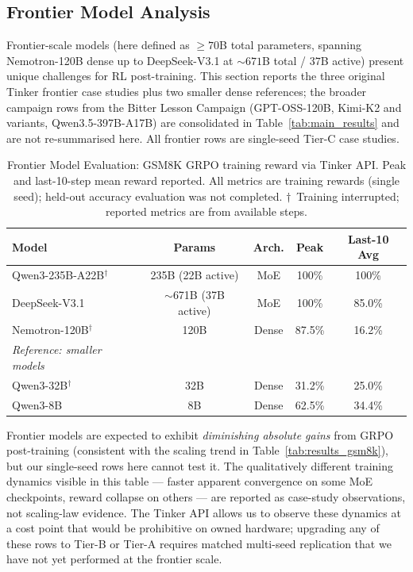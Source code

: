 \documentclass{article}
\begin{document}
\subsection{Frontier Model Analysis}
\label{sec:frontier}

Frontier-scale models (here defined as $\ge 70$B total parameters,
spanning Nemotron-120B dense up to DeepSeek-V3.1 at $\sim 671$B
total / $37$B active) present unique challenges for RL post-training.
This section reports the three original Tinker frontier case
studies plus two smaller dense references; the broader
campaign rows from the Bitter Lesson Campaign
(GPT-OSS-120B, Kimi-K2 and variants, Qwen3.5-397B-A17B) are
consolidated in Table~\ref{tab:main_results} and are not
re-summarised here. All frontier rows are single-seed Tier-C case
studies.

\begin{table}[htbp]
\centering
\caption{Frontier Model Evaluation: GSM8K GRPO training reward via Tinker API.
Peak and last-10-step mean reward reported. All metrics are training rewards
(single seed); held-out accuracy evaluation was not completed.
$\dagger$~Training interrupted; reported metrics are from available steps.}
\label{tab:frontier}
\begin{tabular}{lcccc}
\toprule
\textbf{Model} & \textbf{Params} & \textbf{Arch.} & \textbf{Peak} & \textbf{Last-10 Avg} \\
\midrule
Qwen3-235B-A22B$^\dagger$ & 235B (22B active) & MoE & 100\% & 100\% \\
DeepSeek-V3.1 & $\sim$671B (37B active) & MoE & 100\% & 85.0\% \\
Nemotron-120B$^\dagger$ & 120B & Dense & 87.5\% & 16.2\% \\
\midrule
\textit{Reference: smaller models} & & & & \\
Qwen3-32B$^\dagger$ & 32B & Dense & 31.2\% & 25.0\% \\
Qwen3-8B & 8B & Dense & 62.5\% & 34.4\% \\
\bottomrule
\end{tabular}
\end{table}

Frontier models are expected to exhibit \emph{diminishing absolute gains}
from GRPO post-training (consistent with the scaling trend in
Table~\ref{tab:results_gsm8k}), but our single-seed rows here cannot
test it. The qualitatively different training dynamics visible in this
table --- faster apparent convergence on some MoE checkpoints, reward
collapse on others --- are reported as case-study observations, not
scaling-law evidence. The Tinker API allows us to observe these
dynamics at a cost point that would be prohibitive on owned hardware;
upgrading any of these rows to Tier-B or Tier-A requires matched
multi-seed replication that we have not yet performed at the
frontier scale.
\end{document}
